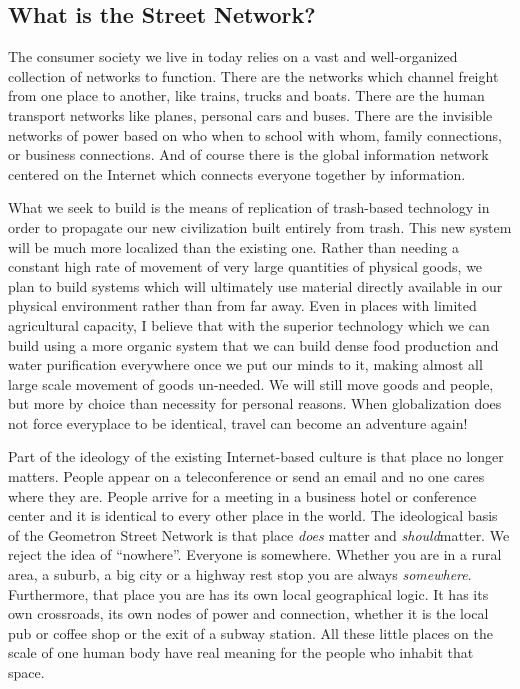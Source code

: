 
\subsection{What is the Street Network?}

The consumer society we live in today relies on a vast and well-organized collection of networks to function.  There are the networks which channel freight from one place to another, like trains, trucks and boats.  There are the human transport networks like planes, personal cars and buses. There are the invisible networks of power based on who when to school with whom, family connections, or business connections.  And of course there is the global information network centered on the Internet which connects everyone together by information.  

What we seek to build is the means of replication of trash-based technology in order to propagate our new civilization built entirely from trash.  This new system will be much more localized than the existing one.  Rather than needing a constant high rate of movement of very large quantities of physical goods, we plan to build systems which will ultimately use material directly available in our physical environment rather than from far away.  Even in places with limited agricultural capacity, I believe that with the superior technology which we can build using a more organic system that we can build dense food production and water purification everywhere once we put our minds to it, making almost all large scale movement of goods un-needed.  We will still move goods and people, but more by choice than necessity for personal reasons.  When globalization does not force everyplace to be identical, travel can become an adventure again!

Part of the ideology of the existing Internet-based culture is that place no longer matters.  People appear on a teleconference or send an email and no one cares where they are. People arrive for a meeting in a business hotel or conference center and it is identical to every other place in the world.  The ideological basis of the Geometron Street Network is that place \emph{does} matter and \emph{should}matter.  We reject the idea of ``nowhere''.  Everyone is somewhere.  Whether you are in a rural area, a suburb, a big city or a highway rest stop you are always \emph{somewhere}.  Furthermore, that place you are has its own local geographical logic. It has its own crossroads, its own nodes of power and connection, whether it is the local pub or coffee shop or the exit of a subway station.  All these little places on the scale of one human body have real meaning for the people who inhabit that space.

